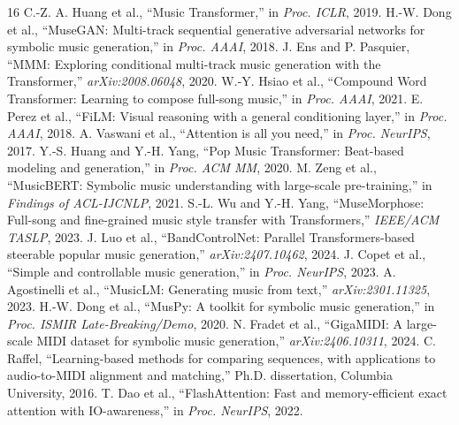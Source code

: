\documentclass[conference]{conference-latex-template_10-17-19/IEEEtran}
\begin{document}
\begin{thebibliography}{16}
 C.-Z. A. Huang et al., ``Music Transformer,'' in \emph{Proc. ICLR}, 2019.
 H.-W. Dong et al., ``MuseGAN: Multi-track sequential generative adversarial networks for symbolic music generation,'' in \emph{Proc. AAAI}, 2018.
 J. Ens and P. Pasquier, ``MMM: Exploring conditional multi-track music generation with the Transformer,'' \emph{arXiv:2008.06048}, 2020.
 W.-Y. Hsiao et al., ``Compound Word Transformer: Learning to compose full-song music,'' in \emph{Proc. AAAI}, 2021.
 E. Perez et al., ``FiLM: Visual reasoning with a general conditioning layer,'' in \emph{Proc. AAAI}, 2018.
 A. Vaswani et al., ``Attention is all you need,'' in \emph{Proc. NeurIPS}, 2017.
 Y.-S. Huang and Y.-H. Yang, ``Pop Music Transformer: Beat-based modeling and generation,'' in \emph{Proc. ACM MM}, 2020.
 M. Zeng et al., ``MusicBERT: Symbolic music understanding with large-scale pre-training,'' in \emph{Findings of ACL-IJCNLP}, 2021.
 S.-L. Wu and Y.-H. Yang, ``MuseMorphose: Full-song and fine-grained music style transfer with Transformers,'' \emph{IEEE/ACM TASLP}, 2023.
 J. Luo et al., ``BandControlNet: Parallel Transformers-based steerable popular music generation,'' \emph{arXiv:2407.10462}, 2024.
 J. Copet et al., ``Simple and controllable music generation,'' in \emph{Proc. NeurIPS}, 2023.
 A. Agostinelli et al., ``MusicLM: Generating music from text,'' \emph{arXiv:2301.11325}, 2023.
 H.-W. Dong et al., ``MusPy: A toolkit for symbolic music generation,'' in \emph{Proc. ISMIR Late-Breaking/Demo}, 2020.
 N. Fradet et al., ``GigaMIDI: A large-scale MIDI dataset for symbolic music generation,'' \emph{arXiv:2406.10311}, 2024.
 C. Raffel, ``Learning-based methods for comparing sequences, with applications to audio-to-MIDI alignment and matching,'' Ph.D. dissertation, Columbia University, 2016.
 T. Dao et al., ``FlashAttention: Fast and memory-efficient exact attention with IO-awareness,'' in \emph{Proc. NeurIPS}, 2022.
\end{thebibliography}
\end{document}
